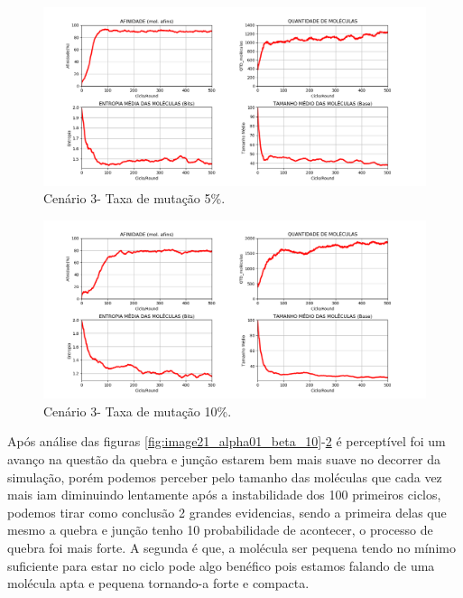 \begin{figure}[!h]
    \centering
    \includegraphics[width=15cm]{figures/image23_alpha05_beta_10.png}
    \caption{Cenário 3- Taxa de mutação 5\%.}
    \label{fig:image23_alpha05_beta_10}
\end{figure}

\begin{figure}[!h]
    \centering
    \includegraphics[width=15cm]{figures/image24_alpha10_beta_10.png}
    \caption{Cenário 3- Taxa de mutação 10\%.}
    \label{fig:image24_alpha10_beta_10}
\end{figure}

\newpage


Após análise das figuras \ref{fig:image21_alpha01_beta_10}-\ref{fig:image24_alpha10_beta_10} é perceptível foi um avanço na questão da quebra
e junção estarem bem mais suave no decorrer da simulação, porém podemos perceber
pelo tamanho das moléculas que cada vez mais iam diminuindo lentamente após a
instabilidade dos 100 primeiros ciclos, podemos tirar como conclusão 2 grandes
evidencias, sendo a primeira delas que mesmo a quebra e junção tenho 10%
probabilidade de acontecer, o processo de quebra foi mais forte. A segunda é que, a
molécula ser pequena tendo no mínimo suficiente para estar no ciclo pode algo benéfico
pois estamos falando de uma molécula apta e pequena tornando-a forte e compacta.

